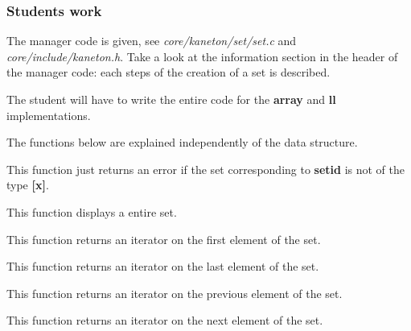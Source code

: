 \subsubsection{Students work}

The  manager code  is given,  see  \textit{core/kaneton/set/set.c} and
\textit{core/include/kaneton.h}. Take a look at the information section
in the header of the manager code: each steps of the creation of a set
is described.

The student will have to  write the entire code for the \textbf{array}
and \textbf{ll} implementations.

The functions below are explained independently of the data structure.


This function just returns an error if the set corresponding to
\textbf{setid} is not of the type \textbf{[x]}.


This function displays a entire set.


This function returns an iterator on the first element of the set.


This function returns an iterator on the last element of the set.


This function returns an iterator on the previous element of the set.


This function returns an iterator on the next element of the set.


